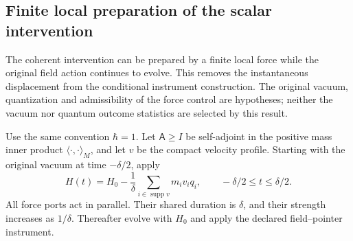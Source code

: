 \subsection{Finite local preparation of the scalar intervention}
\label{sec:source-scalar-local-preparation}

The coherent intervention can be prepared by a finite local force while the
original field action continues to evolve. This removes the instantaneous
displacement from the conditional instrument construction. The original
vacuum, quantization and admissibility of the force control are hypotheses;
neither the vacuum nor quantum outcome statistics are selected by this result.

Use the same convention $\hbar=1$. Let $\mathsf A\ge I$ be self-adjoint in the positive mass inner product
$\langle\cdot,\cdot\rangle_M$, and let $v$ be the compact velocity profile.
Starting with the original vacuum at time $-\delta/2$, apply
\[
 H(t)=H_0-\frac1\delta\sum_{i\in\operatorname{supp}v}m_i v_iq_i,
 \qquad -\delta/2\le t\le\delta/2.
\]
All force ports act in parallel. Their shared duration is $\delta$, and their
strength increases as $1/\delta$. Thereafter evolve with $H_0$ and apply the
declared field--pointer instrument.

